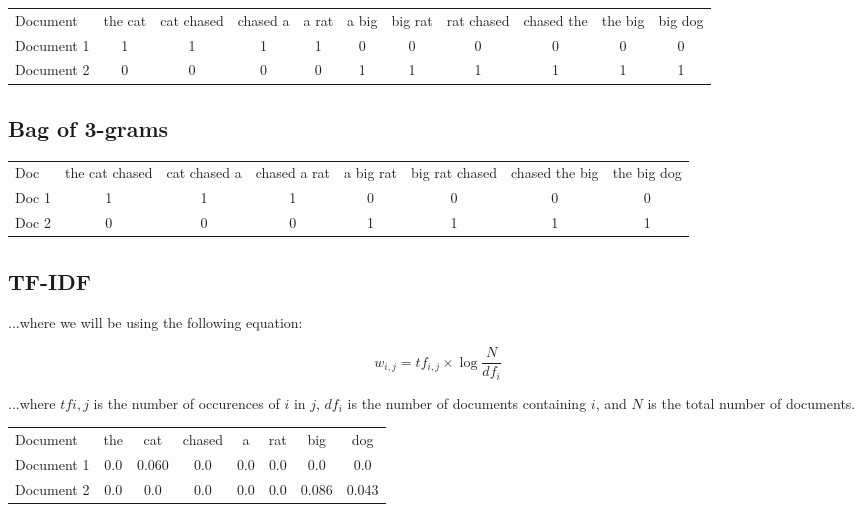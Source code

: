 \documentclass{article}
\begin{document}
\begin{center}
    \begin{tabular}{ l c c c c c c c c c c }
        Document & the cat & cat chased & chased a & a rat & a big & big rat & rat chased & chased the & the big & big dog \\
        Document 1 & 1 & 1 & 1 & 1 & 0 & 0 & 0 & 0 & 0 & 0 \\
        Document 2 & 0 & 0 & 0 & 0 & 1 & 1 & 1 & 1 & 1 & 1\\ 
    \end{tabular}
\end{center}

\subsection*{Bag of 3-grams}

\begin{center}
    \begin{tabular}{ l c c c c c c c }
        Doc & the cat chased & cat chased a & chased a rat & a big rat & big rat chased & chased the big & the big dog\\
        Doc 1 & 1 & 1 & 1 & 0 & 0 & 0 & 0\\
        Doc 2 & 0 & 0 & 0 & 1 & 1 & 1 & 1\\
    \end{tabular}
\end{center}

\subsection*{TF-IDF}

\noindent ...where we will be using the following equation:

\begin{equation}
    w_{i,j} = tf_{i,j} \times \log{\frac{N}{df_i}}
\end{equation}

\noindent ...where $tf{i,j}$ is the number of occurences of $i$ in $j$, $df_i$ is the number of documents containing $i$, and $N$ is the total number of documents.

\begin{center}
    \begin{tabular}{ l c c c c c c c }
        Document & the & cat & chased & a & rat & big & dog \\
        Document 1 & 0.0 & 0.060 & 0.0 & 0.0 & 0.0 & 0.0 & 0.0 \\
        Document 2 & 0.0 & 0.0 & 0.0 & 0.0 & 0.0 & 0.086 & 0.043\\
    \end{tabular}
\end{center}
\end{document}
